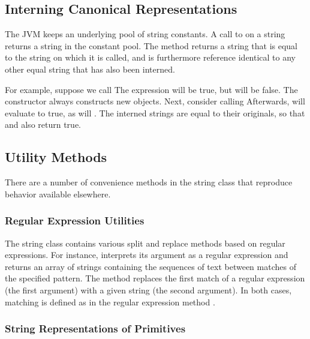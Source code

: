 \subsection{Interning Canonical Representations}\label{section:string-intern}

The JVM keeps an underlying pool of string constants.  A call to
 on a string returns a string in the constant pool.
The method  returns a string that is equal to the
string on which it is called, and is furthermore reference identical
to any other equal string that has also been interned.

For example,  suppose we call
%
%
The expression  will be true, but
 will be false.  The constructor  always
constructs new objects.  Next, consider calling
%
%
Afterwards,  will evaluate to true, as will
.  The interned strings are equal to their
originals, so that  and  also
return true.


\subsection{Utility Methods}

There are a number of convenience methods in the string class that
reproduce behavior available elsewhere.  

\subsubsection{Regular Expression Utilities}

The string class contains various split and replace methods based on
regular expressions.  For instance,  interprets
its argument as a regular expression and returns an array of strings
containing the sequences of text between matches of the specified
pattern.  The method  replaces the
first match of a regular expression (the first argument) with a given
string (the second argument).  In both cases, matching is defined as
in the regular expression method .

\subsubsection{String Representations of Primitives}

